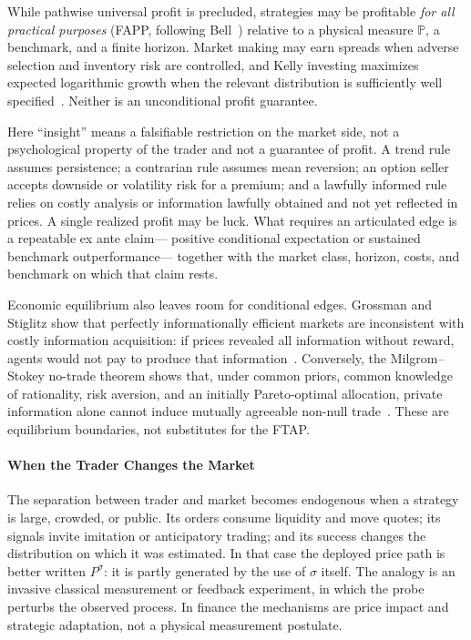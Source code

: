 \documentclass[aps,pra,reprint,superscriptaddress,amsmath,amssymb,floatfix]{revtex4-2}
\theoremstyle{plain}
\theoremstyle{definition}
\theoremstyle{remark}
\begin{document}
While pathwise universal profit is precluded, strategies may be profitable
\emph{for all practical purposes} (FAPP, following Bell~\cite{bell-a})
relative to a physical measure \(\mathbb{P}\), a benchmark, and a finite
horizon. Market making may earn spreads when adverse selection and inventory
risk are controlled, and Kelly investing maximizes expected logarithmic
growth when the relevant distribution is sufficiently well
specified~\cite{Kelly1956}. Neither is an unconditional profit guarantee.

Here ``insight'' means a falsifiable restriction on the market side, not a
psychological property of the trader and not a guarantee of profit. A trend
rule assumes persistence; a contrarian rule assumes mean reversion; an option
seller accepts downside or volatility risk for a premium; and a lawfully
informed rule relies on costly analysis or information lawfully obtained and
not yet reflected in prices. A single realized profit may be luck. What
requires an articulated edge is a repeatable ex ante claim---
positive conditional expectation or sustained benchmark outperformance---
together with the market class, horizon, costs, and benchmark on which that
claim rests.

Economic equilibrium also leaves room for conditional edges. Grossman and
Stiglitz show that perfectly informationally efficient markets are
inconsistent with costly information acquisition: if prices revealed all
information without reward, agents would not pay to produce that
information~\cite{GrossmanStiglitz1980}. Conversely, the Milgrom--Stokey
no-trade theorem shows that, under common priors, common knowledge of
rationality, risk aversion, and an initially Pareto-optimal allocation, private
information alone cannot induce mutually agreeable non-null
trade~\cite{MilgromStokey1982}. These are equilibrium boundaries, not
substitutes for the FTAP.

\paragraph{When the Trader Changes the Market}

The separation between trader and market becomes endogenous when a strategy is
large, crowded, or public. Its orders consume liquidity and move quotes; its
signals invite imitation or anticipatory trading; and its success changes the
distribution on which it was estimated. In that case the deployed price path
is better written \(P^\sigma\): it is partly generated by the use of
\(\sigma\) itself. The analogy is an invasive classical measurement or
feedback experiment, in which the probe perturbs the observed process. In
finance the mechanisms are price impact and strategic adaptation, not a
physical measurement postulate.
\end{document}
